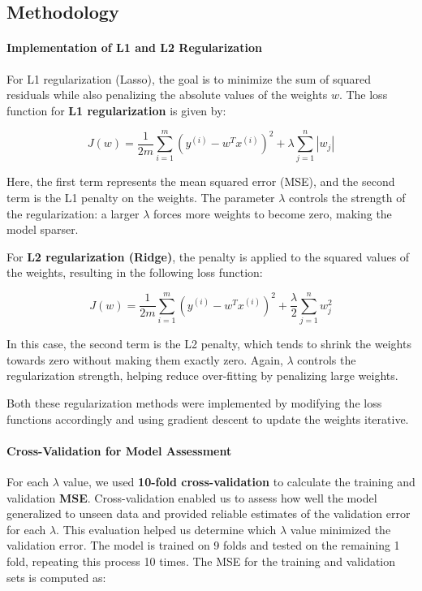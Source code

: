 \documentclass{article}
\begin{document}
\subsection{Methodology}
\paragraph{Implementation of L1 and L2 Regularization}
For L1 regularization (Lasso), the goal is to minimize the sum of squared residuals while also penalizing the absolute values of the weights $w$. The loss function for \textbf{L1 regularization} is given by:

$$
J(w)=\frac{1}{2 m} \sum_{i=1}^m\left(y^{(i)}-w^T x^{(i)}\right)^2+\lambda \sum_{j=1}^n\left|w_j\right|
$$


Here, the first term represents the mean squared error (MSE), and the second term is the L1 penalty on the weights. The parameter $\lambda$ controls the strength of the regularization: a larger $\lambda$ forces more weights to become zero, making the model sparser.

For \textbf{L2 regularization (Ridge)}, the penalty is applied to the squared values of the weights, resulting in the following loss function:

$$
J(w)=\frac{1}{2 m} \sum_{i=1}^m\left(y^{(i)}-w^T x^{(i)}\right)^2+\frac{\lambda}{2} \sum_{j=1}^n w_j^2
$$

In this case, the second term is the L2 penalty, which tends to shrink the weights towards zero without making them exactly zero. Again, $\lambda$ controls the regularization strength, helping reduce over-fitting by penalizing large weights.

Both these regularization methods were implemented by modifying the loss functions accordingly and using gradient descent to update the weights iterative.

\paragraph{Cross-Validation for Model Assessment}
For each $\lambda$ value, we used \textbf{10-fold cross-validation} to calculate the training and validation \textbf{MSE}. Cross-validation enabled us to assess how well the model generalized to unseen data and provided reliable estimates of the validation error for each $\lambda$. This evaluation helped us determine which $\lambda$ value minimized the validation error. The model is trained on 9 folds and tested on the remaining 1 fold, repeating this process 10 times. The MSE for the training and validation sets is computed as:
\end{document}

